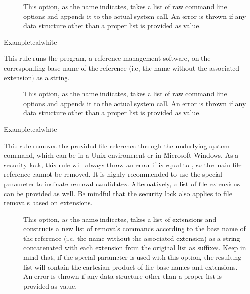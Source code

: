 \begin{description}
\begin{description}
\item[] This option, as the name indicates, takes a list of raw command line options and appends it to the actual system call. An error is thrown if any data structure other than a proper list is provided as value.
\end{description}

\begin{codebox}{Example}{teal}{\icnote}{white}
\end{codebox}

\item[\rulebox{bibtex}{Marco Daniel, Paulo Cereda}] This rule runs the  program, a reference management software, on the corresponding base name of the  reference (i.e, the name without the associated extension) as a string.

\begin{description}
\item[] This option, as the name indicates, takes a list of raw command line options and appends it to the actual system call. An error is thrown if any data structure other than a proper list is provided as value.
\end{description}

\begin{codebox}{Example}{teal}{\icnote}{white}
\end{codebox}

\item[\rulebox{clean}{Marco Daniel, Paulo Cereda}] This rule removes the provided file reference through the underlying system command, which can be  in a Unix environment or  in Microsoft Windows. As a security lock, this rule will always throw an error if  is equal to , so the main file reference cannot be removed. It is highly recommended to use the special  parameter to indicate removal candidates. Alternatively, a list of file extensions can be provided as well. Be mindful that the security lock also applies to file removals based on extensions.

\begin{description}
\item[] This option, as the name indicates, takes a list of extensions and constructs a new list of removals commands according to the base name of the  reference (i.e, the name without the associated extension) as a string concatenated with each extension from the original list as suffixes. Keep in mind that, if the special  parameter is used with this option, the resulting list will contain the cartesian product of file base names and extensions. An error is thrown if any data structure other than a proper list is provided as value.


\end{description}
\end{description}
